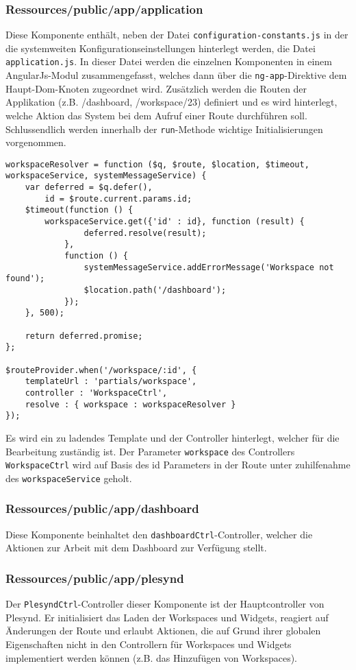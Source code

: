 \subsubsection*{Ressources/public/app/application}\label{section:app_application}
Diese Komponente enthält, neben der Datei \texttt{configuration-constants.js} in der die systemweiten Konfigurationseinstellungen hinterlegt werden, die Datei \texttt{application.js}. In dieser Datei werden die einzelnen Komponenten in einem AngularJs-Modul zusammengefasst, welches dann über die \texttt{ng-app}-Direktive dem Haupt-Dom-Knoten zugeordnet wird. Zusätzlich werden die Routen der Applikation (z.B. /dashboard, /workspace/23) definiert und es wird hinterlegt, welche Aktion das System bei dem Aufruf einer Route durchführen soll. Schlussendlich werden innerhalb der \texttt{run}-Methode wichtige Initialisierungen vorgenommen.
\begin{lstlisting}
workspaceResolver = function ($q, $route, $location, $timeout, workspaceService, systemMessageService) {
    var deferred = $q.defer(),
        id = $route.current.params.id;
    $timeout(function () {
        workspaceService.get({'id' : id}, function (result) {
                deferred.resolve(result);
            },
            function () {
                systemMessageService.addErrorMessage('Workspace not found');
                $location.path('/dashboard');
            });
    }, 500);

    return deferred.promise;
};

$routeProvider.when('/workspace/:id', {
    templateUrl : 'partials/workspace',
    controller : 'WorkspaceCtrl',
    resolve : { workspace : workspaceResolver }
});
\end{lstlisting}

Es wird ein zu ladendes Template und der Controller hinterlegt, welcher für die Bearbeitung zuständig ist. Der Parameter \texttt{workspace} des Controllers \texttt{WorkspaceCtrl} wird auf Basis des id Parameters in der Route unter zuhilfenahme des \texttt{workspaceService} geholt. 
\subsubsection*{Ressources/public/app/dashboard}
Diese Komponente beinhaltet den \texttt{dashboardCtrl}-Controller, welcher die Aktionen zur Arbeit mit dem Dashboard zur Verfügung stellt.

\subsubsection*{Ressources/public/app/plesynd}
Der \texttt{PlesyndCtrl}-Controller dieser Komponente ist der Hauptcontroller von Plesynd. Er initialisiert das Laden der Workspaces und Widgets, reagiert auf Änderungen der Route und erlaubt Aktionen, die auf Grund ihrer globalen Eigenschaften nicht in den Controllern für Workspaces und Widgets implementiert werden können (z.B. das Hinzufügen von Workspaces).

